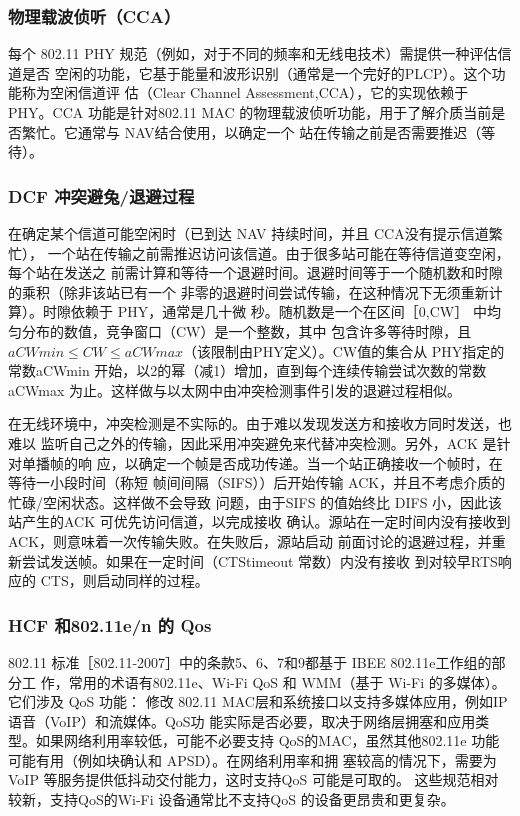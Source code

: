 \subsubsection{物理载波侦听（CCA）}

每个 802.11 PHY 规范（例如，对于不同的频率和无线电技术）需提供一种评估信道是否
空闲的功能，它基于能量和波形识别（通常是一个完好的PLCP）。这个功能称为空闲信道评
估（Clear Channel Assessment,CCA），它的实现依赖于 PHY。CCA 功能是针对802.11 MAC
的物理载波侦听功能，用于了解介质当前是否繁忙。它通常与 NAV结合使用，以确定一个
站在传输之前是否需要推迟（等待）。

\subsubsection{DCF 冲突避兔/退避过程}

在确定某个信道可能空闲时（已到达 NAV 持续时间，并且 CCA没有提示信道繁忙），
一个站在传输之前需推迟访问该信道。由于很多站可能在等待信道变空闲，每个站在发送之
前需计算和等待一个退避时间。退避时间等于一个随机数和时隙的乘积（除非该站已有一个
非零的退避时间尝试传输，在这种情况下无须重新计算）。时隙依赖于 PHY，通常是几十微
秒。随机数是一个在区间［0,CW］ 中均匀分布的数值，竞争窗口（CW）是一个整数，其中
包含许多等待时隙，且$aCWmin \leq CW \leq aCWmax$（该限制由PHY定义）。CW值的集合从
PHY指定的常数aCWmin 开始，以2的幂（减1）增加，直到每个连续传输尝试次数的常数
aCWmax 为止。这样做与以太网中由冲突检测事件引发的退避过程相似。

在无线环境中，冲突检测是不实际的。由于难以发现发送方和接收方同时发送，也难以
监听自己之外的传输，因此采用冲突避免来代替冲突检测。另外，ACK 是针对单播帧的响
应，以确定一个帧是否成功传递。当一个站正确接收一个帧时，在等待一小段时间（称短
帧间间隔（SIFS））后开始传输 ACK，并且不考虑介质的忙碌/空闲状态。这样做不会导致
问题，由于SIFS 的值始终比 DIFS 小，因此该站产生的ACK 可优先访问信道，以完成接收
确认。源站在一定时间内没有接收到ACK，则意味着一次传输失败。在失败后，源站启动
前面讨论的退避过程，并重新尝试发送帧。如果在一定时间（CTStimeout 常数）内没有接收
到对较早RTS响应的 CTS，则启动同样的过程。

\subsubsection{HCF 和802.11e/n 的 Qos}

802.11 标准［802.11-2007］中的条款5、6、7和9都基于 IBEE 802.11e工作组的部分工
作，常用的术语有802.11e、Wi-Fi QoS 和 WMM（基于 Wi-Fi 的多媒体）。它们涉及 QoS 功能：
修改 802.11 MAC层和系统接口以支持多媒体应用，例如IP 语音（VoIP）和流媒体。QoS功
能实际是否必要，取决于网络层拥塞和应用类型。如果网络利用率较低，可能不必要支持
QoS的MAC，虽然其他802.11e 功能可能有用（例如块确认和 APSD）。在网络利用率和拥
塞较高的情况下，需要为VoIP 等服务提供低抖动交付能力，这时支持QoS 可能是可取的。
这些规范相对较新，支持QoS的Wi-Fi 设备通常比不支持QoS 的设备更昂贵和更复杂。

